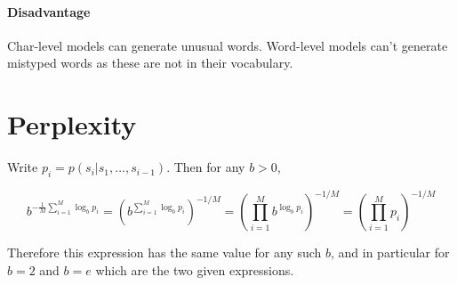 \documentclass{article}
\begin{document}
\paragraph{Disadvantage}
Char-level models can generate unusual words. Word-level models can't generate mistyped words as these are not in their vocabulary. 

\section{Perplexity}

Write $p_i = p(s_i|s_1,\ldots,s_{i-1})$. Then for any $b > 0$,

$$b^{-\frac{1}{M}\sum_{i=1}^M \log_b p_i} = (b^{\sum_{i=1}^M \log_b p_i})^{-1/M} = (\prod_{i=1}^M b^{\log_b p_i})^{-1/M} = (\prod_{i=1}^M p_i)^{-1/M}$$

Therefore this expression has the same value for any such $b$, and in particular for $b=2$ and $b=e$ which are the two given expressions.
\end{document}
